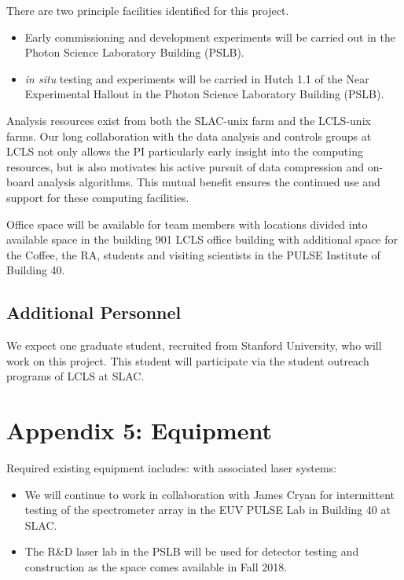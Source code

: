 There are two principle facilities identified for this project.
\begin{itemize}
\item Early commissioning and development experiments will be carried out in the Photon Science Laboratory Building (PSLB).
\item \textit{in situ} testing and experiments will be carried in Hutch 1.1 of the Near Experimental Hallout in the Photon Science Laboratory Building (PSLB).
\end{itemize}

Analysis resources exist from both the SLAC-unix farm and the LCLS-unix farms.  
Our long collaboration with the data analysis and controls groups at LCLS not only allows the PI particularly early insight into the computing resources, but is also motivates his active pursuit of data compression and on-board analysis algorithms.
This mutual benefit ensures the continued use and support for these computing facilities.

Office space will be available for team members with locations divided into available space in the building 901 LCLS office building with additional space for the Coffee, the RA, students and visiting scientists in the PULSE Institute of Building 40.

\subsection*{Additional Personnel}%

We expect one graduate student, recruited from Stanford University, who will work on this project.
This student will participate via the student outreach programs of LCLS at SLAC.

\clearpage
\appendix
\section*{Appendix 5: Equipment}

Required existing equipment includes:
\vspace{\baselineskip}
with associated laser systems: 
\begin{itemize}
\item We will continue to work in collaboration with James Cryan for intermittent testing of the spectrometer array in the EUV PULSE Lab in Building 40 at SLAC.
\item The R\&D laser lab in the PSLB will be used for detector testing and construction as the space comes available in Fall 2018.
\end{itemize}
\vspace{\baselineskip}

